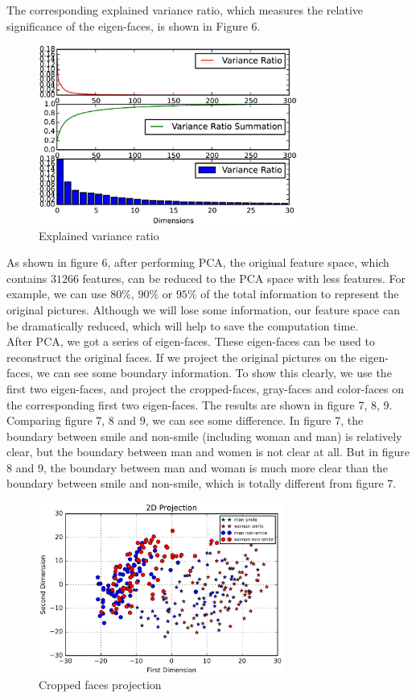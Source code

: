 \documentclass[11pt,letterpaper]{article}
\begin{document}
The corresponding explained variance ratio, which measures the relative significance of the eigen-faces, is shown in Figure 6.\\

\begin{figure}[H]
\centering
\includegraphics[width=85mm]{ratioChange.png}
\caption{Explained variance ratio}
\label{Fig2.lable}
\end{figure}

As shown in figure 6, after performing PCA, the original feature space, which contains $31266$ features, can be reduced to the PCA space with less features. For example, we can use $80\%$, $90\%$ or $95\%$ of the total information to represent the original pictures. Although we will lose some information, our feature space can be dramatically reduced, which will help to save the computation time.\\

After PCA, we got a series of eigen-faces. These eigen-faces can be used to reconstruct the original faces. If we project the original pictures on the eigen-faces, we can see some boundary information. To show this clearly, we use the first two eigen-faces, and project the cropped-faces, gray-faces and color-faces on the corresponding first two eigen-faces. The results are shown in figure 7, 8, 9.\\

Comparing figure 7, 8 and 9, we can see some difference. In figure 7, the boundary between smile and non-smile (including woman and man) is relatively clear, but the boundary between man and women is not clear at all. But in figure 8 and 9, the boundary between man and woman is much more clear than the boundary between smile and non-smile, which is totally different from figure 7.

\begin{figure}[H]
\centering
\includegraphics[width=81mm]{little_2dProjection.png}
\caption{Cropped faces projection}
\label{little.lable}
\end{figure}
\end{document}
